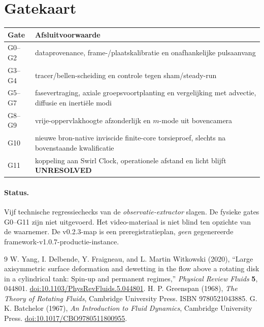 \documentclass[10pt,a4paper]{article}
\begin{document}
\section{Gatekaart}
\small
\begin{tabularx}{\linewidth}{@{}p{1.0cm}X@{}}
\toprule
Gate & Afsluitvoorwaarde \\\midrule
G0--G2 & dataprovenance, frame-/plaatskalibratie en onafhankelijke pulsaanvang \\
G3--G4 & tracer/bellen-scheiding en controle tegen sham/steady-run \\
G5--G7 & fasevertraging, axiale groepsvoortplanting en vergelijking met advectie, diffusie en inertiële modi \\
G8--G9 & vrije-oppervlakhoogte afzonderlijk en $m$-mode uit bovencamera \\
G10 & nieuwe bron-native inviscide finite-core torsieproef, slechts na bovenstaande kwalificatie \\
G11 & koppeling aan Swirl Clock, operationele afstand en licht blijft \textbf{UNRESOLVED} \\
\bottomrule
\end{tabularx}
\normalsize
\paragraph{Status.} Vijf technische regressiechecks van de \emph{observatie-extractor} slagen. De fysieke gates G0--G11 zijn niet uitgevoerd. Het video-materiaal is niet blind ten opzichte van de waarnemer. De v0.2.3-map is een preregistratieplan, \emph{geen} gegenereerde framework-v1.0.7-productie-instance.
\begin{thebibliography}{9}\small
{} W. Yang, I. Delbende, Y. Fraigneau, and L. Martin Witkowski (2020),
``Large axisymmetric surface deformation and dewetting in the flow above a rotating disk in a cylindrical tank: Spin-up and permanent regimes,''
\emph{Physical Review Fluids} \textbf{5}, 044801.
\href{https://doi.org/10.1103/PhysRevFluids.5.044801}{doi:10.1103/PhysRevFluids.5.044801}.
 H. P. Greenspan (1968), \emph{The Theory of Rotating Fluids}, Cambridge University Press. ISBN 9780521043885.
 G. K. Batchelor (1967), \emph{An Introduction to Fluid Dynamics}, Cambridge University Press. \href{https://doi.org/10.1017/CBO9780511800955}{doi:10.1017/CBO9780511800955}.
\end{thebibliography}
\end{document}

